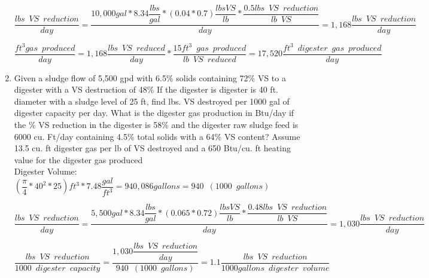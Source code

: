 \begin{enumerate}
{
$
	\dfrac
	{
	lbs \enspace VS \enspace reduction
	}
	{
	day
	}
	=
	\dfrac
	{
	10,000 gal * 8.34 \dfrac{lbs}{gal}*(0.04*0.7) \dfrac{lbs VS}{lb}*\dfrac{0.5 lbs \enspace VS \enspace  reduction}{lb \enspace VS}
	}
	{
	day
	}
 	=1,168
	\dfrac
	{
	lbs \enspace VS \enspace reduction
	}
	{
	day 
	}
$
}\\
\vspace{3mm}

{
$
	\dfrac 
	{
	ft^3 gas \enspace produced
	}
	{
	day
	}
	=
	1,168 \dfrac
			{
			lbs \enspace VS \enspace reduced
			}
			{
			day
			}
			*
		\dfrac
		{
		15 ft^3 \enspace gas \enspace produced
		}
		{
		lb \enspace VS \enspace reduced
		}
		=17,520 \dfrac
				{
				ft^3 \enspace digester \enspace 					gas \enspace produced
				}
				{
				day
				}
$
} 


\item Given a sludge flow of 5,500 gpd with 6.5\% solids containing  72\% VS to a digester with a VS destruction of 48\%   If the digester is digester is 40 ft. diameter with a sludge level of 25 ft, find lbs. VS destroyed per 1000 gal of digester capacity per day.  What is the digester gas production in Btu/day if the \% VS reduction in the digester is 58\% and the digester raw sludge feed is 6000 cu. Ft/day containing 4.5\% total solids with a 64\% VS content?  Assume 13.5 cu. ft digester gas per lb of VS destroyed and a 650 Btu/cu. ft heating value for the digester gas produced\\

{
Digester Volume: 
$
{
		(\dfrac
			{\pi}
			{4}*40^2*25)ft^3 *7.48 \dfrac{gal}{ft^3}
	}=940,086 gallons=940 \enspace(1000 \enspace gallons)
$
}\\
\vspace{3mm}

{
$
	\dfrac
	{
	lbs \enspace VS \enspace reduction
	}
	{
	day
	}
	=
	\dfrac
	{
	5,500 gal * 8.34 \dfrac{lbs}{gal}*(0.065*0.72) \dfrac{lbs VS}{lb}*\dfrac{0.48 lbs \enspace VS \enspace  reduction}{lb \enspace VS}
	}
	{
	day
	}
 	=1,030
	\dfrac
	{
	lbs \enspace VS \enspace reduction
	}
	{
	day 
	}
$
}\\
\vspace{3mm}


{
$
	\dfrac
	{
	lbs \enspace VS \enspace reduction
	}
	{
	1000 \enspace digester \enspace capacity
	}
	=
	\dfrac
	{
	1,030 \dfrac
			{
			lbs \enspace VS \enspace reduction
			}
			{
			day
			}
	}
	{	
	940 \enspace (1000 \enspace gallons)
	}
 	=1.1
	\dfrac
	{
	lbs \enspace VS \enspace reduction
	}
	{
	1000 gallons \enspace digester \enspace volume 
	}
$
}\\
\vspace{3mm}



\end{enumerate}
